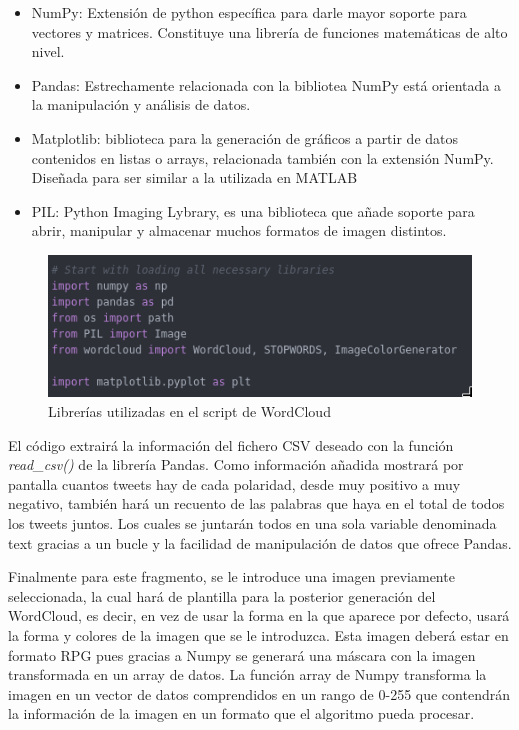 \begin{itemize}
	\item NumPy: Extensión de python específica para darle mayor soporte para vectores y matrices. Constituye una librería de funciones matemáticas de alto nivel.
	\item Pandas: Estrechamente relacionada con la bibliotea NumPy está orientada a la manipulación y análisis de datos. 	
	\item Matplotlib: biblioteca para la generación de gráficos a partir de datos contenidos en listas o arrays, relacionada también con la extensión NumPy. Diseñada para ser similar a la utilizada en MATLAB
	\item PIL: Python Imaging Lybrary, es una biblioteca que añade soporte para abrir, manipular y almacenar muchos formatos de imagen distintos. 
	
\end{itemize}


\begin{figure}[H]
	\centering
	\includegraphics[scale=.5]{imagenes/include-words.png}
	\caption{Librerías utilizadas en el script de WordCloud}
	\label{fig:include-words}
\end{figure}


El código extrairá la información del fichero CSV deseado con la función \textit{read\_csv()} de la librería Pandas. Como información añadida mostrará por pantalla cuantos tweets hay de cada polaridad, desde muy positivo a muy negativo, también hará un recuento de las palabras que haya en el total de todos los tweets juntos. Los cuales se juntarán todos en una sola variable denominada text gracias a un bucle y la facilidad de manipulación de datos que ofrece Pandas.
 
 Finalmente para este fragmento, se le introduce una imagen previamente seleccionada, la cual hará de plantilla para la posterior generación del WordCloud, es decir, en vez de usar la forma en la que aparece por defecto, usará la forma y colores de la imagen que se le introduzca. Esta imagen deberá estar en formato RPG pues gracias a Numpy se generará una máscara con la imagen transformada en un array de datos. La función array de Numpy transforma la imagen en un vector de datos comprendidos en un rango de 0-255 que contendrán la información de la imagen en un formato que el algoritmo pueda procesar.

